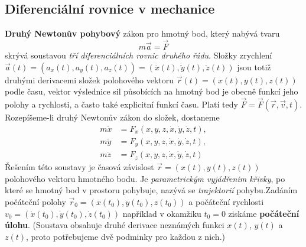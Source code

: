     \subsection{Diferenciální rovnice v mechanice}
      \textbf{Druhý Newtonův pohybový} zákon pro hmotný bod, který nabývá tvaru
      \begin{equation*}
        m\vec{a} = \vec{F}
      \end{equation*}
      skrývá soustavou \emph{tří diferenciálních rovnic druhého řádu}. Složky zrychlení \(\vec{a}(t)
      = (a_x(t), a_y(t), a_z(t)) = (\ddot{x}(t), \ddot{y}(t), \ddot{z}(t))\) jsou totiž druhými
      derivacemi složek polohového vektoru \(\vec{r}(t) = (x(t), y(t), z(t))\) podle času, vektor
      výslednice sil působících na hmotný bod je obecně funkcí jeho polohy a rychlosti, a často také
      explicitní funkcí času. Platí tedy \(\vec{F} = \vec{F}(\vec{r},\vec{v},t)\). Rozepíšeme-li
      druhý Newtonův zákon do složek, dostaneme
      \begin{align*}
        m\ddot{x} & = F_x(x,y,z,\dot{x}, \dot{y}, \dot{z}, t),        \\
        m\ddot{y} & = F_y(x,y,z,\dot{x}, \dot{y}, \dot{z}, t),        \\
        m\ddot{z} & = F_z(x,y,z,\dot{x}, \dot{y}, \dot{z}, t)
      \end{align*}
      Řešením této soustavy je časová závislost \(\vec{r} = (x(t), y(t), z(t))\) polohového vektoru
      hmotného bodu. Je \emph{parametrickým vyjádřenim křivky}, po které se hmotný bod v prostoru
      pohybuje, nazývá se \emph{trajektorií} pohybu.Zadáním počáteční polohy \(\vec{r}_0 = (x(t_0),
      y(t_0), z(t_0))\) a počáteční rychlosti \(v_0 = (\dot{x}(t_0), \dot{y}(t_0), \dot{z}(t_0))\)
      například v okamžiku \(t_0 = 0\) ziskáme \textbf{počáteční úlohu}. (Soustava obsahuje druhé
      derivace neznámých funkci \(x(t)\), \(y(t)\) a \(z(t)\), proto potřebujeme dvě podminky pro
      každou z nich.) 
      
